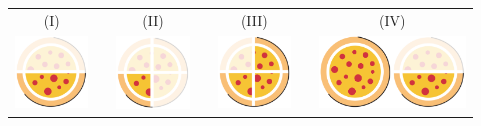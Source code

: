 \begin{center}
\begin{tabular}{ccccccc}
(I)&\quad\quad\quad & (II) &\quad\quad\quad&  (III) &\quad\quad\quad&  (IV) \\
 \includegraphics[width=55pt, keepaspectratio]{../figuras/licao03/ativ2_fig_b_meia_pizza.png} & & \includegraphics[width=55pt, keepaspectratio]{../figuras/licao03/ativ2_fig_b_quarto_pizza.png} & &\includegraphics[width=55pt, keepaspectratio]{../figuras/licao03/ativ2_fig_b_tres_quartos_pizza.png} & &\includegraphics[width=55pt, keepaspectratio]{../figuras/licao03/pizza.png}\includegraphics[width=55pt, keepaspectratio]{../figuras/licao03/ativ2_fig_b_meia_pizza.png}
\end{tabular}

\end{center}


  \begin{center}
\end{center}

